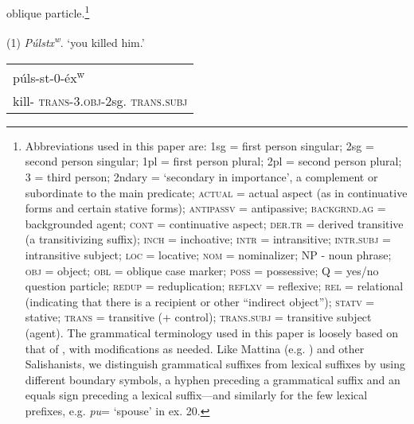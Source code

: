\documentclass[output=paper,colorlinks,citecolor=brown]{langscibook}
\begin{document}
  oblique particle.\footnote{Abbreviations used in this paper are:
  1sg = first person singular; 2sg = second person singular; 1pl =
  first person plural; 2pl = second person plural; 3 = third person;
  2ndary = `secondary in importance', a complement or subordinate to
  the main predicate; \textsc{actual} = actual aspect (as in
  continuative forms and certain stative forms); \textsc{antipassv} =
  antipassive; \textsc{backgrnd.ag} = backgrounded agent; \textsc{cont} =
  continuative aspect; \textsc{der.tr} = derived transitive (a
  transitivizing suffix); \textsc{inch} = inchoative; \textsc{intr} =
  intransitive; \textsc{intr.subj} = intransitive subject; \textsc{loc} =
  locative; \textsc{nom} = nominalizer; NP - noun phrase; \textsc{obj} =
  object; \textsc{obl} = oblique case marker; \textsc{poss} = possessive; Q
  = yes/no question particle; \textsc{redup} = reduplication; \textsc{     reflxv} = reflexive; \textsc{rel} = relational (indicating that
  there is a recipient or other ``indirect object''); \textsc{statv} =
  stative; \textsc{trans} = transitive (+ control); \textsc{trans.subj} =
  transitive subject (agent).  The grammatical terminology used in
  this paper is loosely based on that of \cite{Carlson:1972}, with
  modifications as needed.  Like Mattina (e.g. \cite{Mattina:1987}) and other
  Salishanists, we distinguish grammatical suffixes from lexical
  suffixes by using different boundary symbols, a hyphen preceding a
  grammatical suffix and an equals sign preceding a lexical
  suffix---and similarly for the few lexical prefixes, e.g. \emph{pu\textglotstop}= `spouse' in ex. 20.}


  \clearpage


\noindent (1) \emph{P\'ulstx\textsuperscript w}. `you killed him.'


\noindent\hspace*{.3in}\parbox[t]{5.5in}{

\begin{tabular}{l}

 p\'uls-st-0-\'ex\textsuperscript w\\
 kill-\textsc{  trans}-3.\textsc{obj}-2sg.\textsc{  trans.subj}\\

\end{tabular}

}

\end{document}
